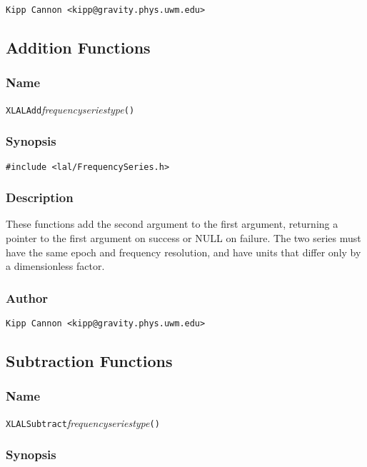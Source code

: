 \verb|Kipp Cannon <kipp@gravity.phys.uwm.edu>|


\subsection{Addition Functions}

\subsubsection{Name}

\texttt{XLALAdd}\textit{frequencyseriestype}\texttt{()}

\subsubsection{Synopsis}

\begin{verbatim}
#include <lal/FrequencySeries.h>
\end{verbatim}


\subsubsection{Description}

These functions add the second argument to the first argument, returning a
pointer to the first argument on success or NULL on failure.  The two
series must have the same epoch and frequency resolution, and have units
that differ only by a dimensionless factor.

\subsubsection{Author}

\verb|Kipp Cannon <kipp@gravity.phys.uwm.edu>|


\subsection{Subtraction Functions}

\subsubsection{Name}

\texttt{XLALSubtract}\textit{frequencyseriestype}\texttt{()}

\subsubsection{Synopsis}

